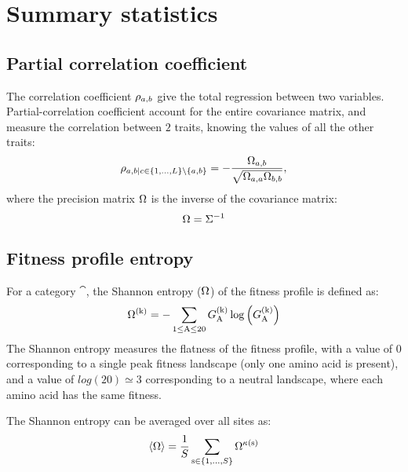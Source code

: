 \section{Summary statistics}
\label{sec:summary-statistics}

\subsection{Partial correlation coefficient}
\label{subsec:partial-correlation-coefficient}

The correlation coefficient $\rho_{a, b}$ give the total regression between two variables.
Partial-correlation coefficient account for the entire covariance matrix, and measure the correlation between $2$ traits, knowing the values of all the other traits:
\begin{equation}
    \rho_{a, b | c \in \{1, \hdots, L\} \setminus \{ a, b\} } = - \dfrac{\Omega_{a, b}}{\sqrt{\Omega_{a, a} \Omega_{b, b}}},
\end{equation}
where the precision matrix $\Omega$ is the inverse of the covariance matrix:
\begin{equation}
    \Omega = \Sigma^{-1}
\end{equation}

\subsection{Fitness profile entropy}
\label{subsec:fitness-profile-entropy}

For a category $\cat$, the Shannon entropy (${\Omega}$) of the fitness profile is defined as:
\begin{equation}
    {\Omega}^{(\text{k})} = - \sum\limits_{1 \leq \text{A} \leq 20} G^{(\text{k})}_{\text{A}} \log \left( G^{(\text{k})}_{\text{A}} \right)
\end{equation}
The Shannon entropy measures the flatness of the fitness profile, with a value of $0$ corresponding to a single peak fitness landscape (only one amino acid is present), and a value of $log(20)\simeq3$ corresponding to a neutral landscape, where each amino acid has the same fitness.

The Shannon entropy can be averaged over all sites as:
\begin{equation}
    \langle {\Omega} \rangle = \dfrac{1}{S}\sum\limits_{\text{s} \in \{1, \hdots, S\}} {\Omega}^{\kappa\left(\text{s}\right)}
\end{equation}


